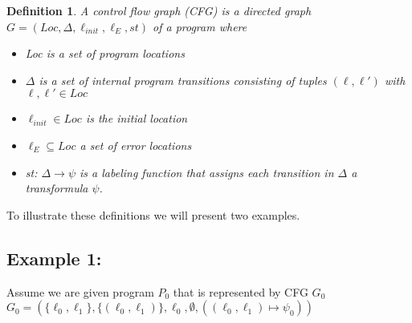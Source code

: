 \documentclass{article}
\newtheorem{mydef}{Definition}
\begin{document}
	\begin{mydef}
		A control flow graph (CFG) is a directed graph $G = (Loc, \Delta, \ell_{init}, \ell_E, st)$ of a program where
		\begin{itemize}
			\item  Loc is a set of program locations
			\item $\Delta$ is a set of internal program transitions consisting of tuples $(\ell, \ell')$ with $\ell, \ell' \in Loc$
			\item $\ell_{init} \in Loc$ is the initial location
			\item $\ell_E \subseteq Loc$ a set of error locations
			\item st: $\Delta \rightarrow \psi$ is a labeling function that assigns each transition in $\Delta$ a transformula $\psi$.
		\end{itemize}
	\end{mydef} \noindent
	 \bigskip

	To illustrate these definitions we will present two examples.
	
	\medskip

	\subsection*{Example 1:}
	Assume we are given program $P_0$ that is represented by CFG $G_0$ \\ $G_0 = (\{ \ell_0, \ell_1 \}, \{ (\ell_0, \ell_1)\}, \ell_0, \emptyset, ((\ell_0, \ell_1) 
	\mapsto \psi_0))$
	
	\bigskip
		
\end{document}
